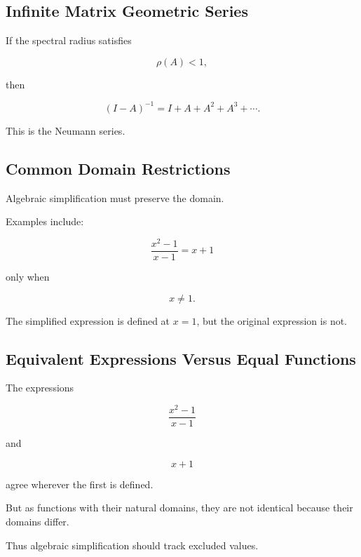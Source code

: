 \subsection{Infinite Matrix Geometric Series}
\label{subsec:infinite-matrix-geometric-series}

If the spectral radius satisfies

\[
\rho(A)<1,
\]

then

\[
\boxed{
(I-A)^{-1}
=
I+A+A^2+A^3+\cdots.
}
\]

This is the Neumann series.

\subsection{Common Domain Restrictions}
\label{subsec:algebra-domain-restrictions}

Algebraic simplification must preserve the domain.

Examples include:

\[
\boxed{
\frac{x^2-1}{x-1}
=
x+1
}
\]

only when

\[
\boxed{
x\neq1.
}
\]

The simplified expression is defined at \(x=1\), but the original expression
is not.

\subsection{Equivalent Expressions Versus Equal Functions}
\label{subsec:equivalent-expressions-functions}

The expressions

\[
\frac{x^2-1}{x-1}
\]

and

\[
x+1
\]

agree wherever the first is defined.

But as functions with their natural domains, they are not identical because
their domains differ.

Thus algebraic simplification should track excluded values.

